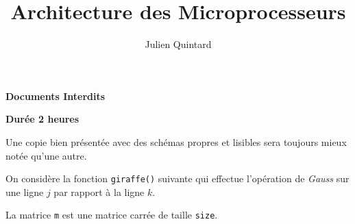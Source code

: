 %
%
%
%
%
%

%
%

%
%

\def\path{../../../..}

%
%



%
%


%
%

\title{Architecture des Microprocesseurs}

%
%

\author{\small{Julien Quintard}}

%
%



%
%

\maketitle

%
%

\indentation{}

%
%

\begin{center}

\textbf{Documents Interdits}

\textbf{Dur\'ee 2 heures}

\scriptsize{Une copie bien pr\'esent\'ee avec des sch\'emas propres et
	    lisibles sera toujours mieux not\'ee qu'une autre.}
\end{center}

%
%

On consid\`ere la fonction \texttt{giraffe()} suivante qui effectue
l'op\'eration de \textit{Gauss} sur une ligne $j$ par rapport \`a
la ligne $k$.

La matrice \texttt{m} est une matrice carr\'ee de taille \texttt{size}.

